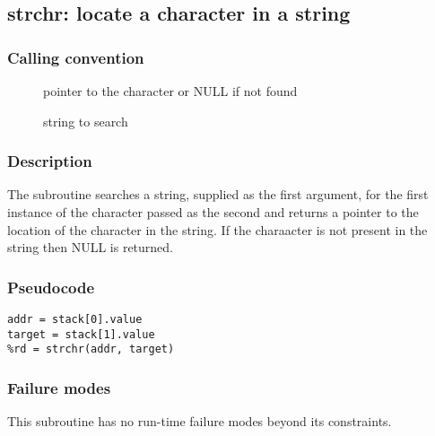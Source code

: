 \clearpage
{}
{}
\label{subr:strchr}
\subsection*{strchr: locate a character in a string}

\subsubsection*{Calling convention}

\begin{description}
\item[] pointer to the character or NULL if not found
\item[] string to search
\end{description}

\subsubsection*{Description}

The  subroutine searches a string, supplied as the
first argument, for the first instance of the character passed as the
second and returns a pointer to the location of the character in the
string.  If the charaacter is not present in the string then NULL is
returned.

\subsubsection*{Pseudocode}

\begin{verbatim}
addr = stack[0].value
target = stack[1].value
%rd = strchr(addr, target)
\end{verbatim}

\subsubsection*{Failure modes}

This subroutine has no run-time failure modes beyond its constraints.
